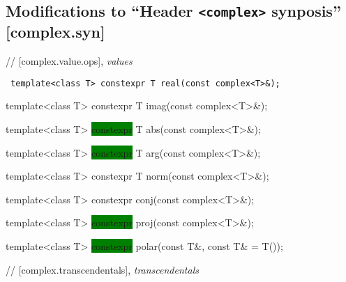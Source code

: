 \documentclass[prd,twocolumn,amsmath,amssymb,nofootinbib,eqsecnum]{revtex4-1}
\newcommand{\code}[1]{{\tt #1}}
\newcommand{\header}[1]{{\tt <#1>}}
\newcommand{\highlight}[1]{\colorbox{green}{\!\!\!\! #1}}
\begin{document}
\subsection{Modifications to ``Header \header{complex} synposis'' [complex.syn]}

// [complex.value.ops], {\it values }

\vspace{2ex}

\code{
  	template<class T> constexpr T real(const complex<T>\&);
	
  	template<class T> constexpr T imag(const complex<T>\&);

	\vspace{2ex}

	template<class T> \highlight{constexpr} T abs(const complex<T>\&);
 	
	template<class T> \highlight{constexpr} T arg(const complex<T>\&);
	
	template<class T> constexpr T norm(const complex<T>\&);
	
	\vspace{2ex}
	
	template<class T> constexpr conj(const complex<T>\&);
	
	template<class T> \highlight{constexpr} proj(const complex<T>\&);
	
	template<class T> \highlight{constexpr} polar(const T\&, const T\& = T());	

}

\vspace{2ex}

// [complex.transcendentals], {\it transcendentals}
\end{document}
